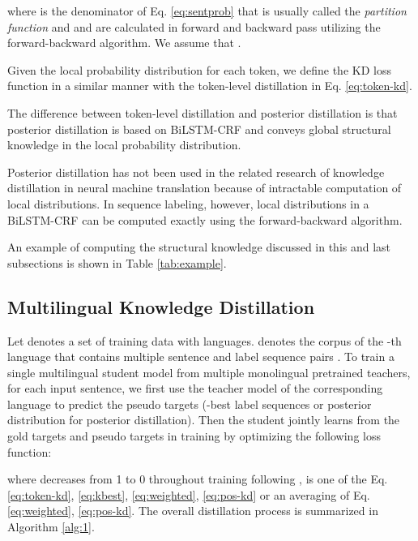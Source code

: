 \documentclass[11pt,a4paper]{article}
\begin{document}
where  is the denominator of Eq. \ref{eq:sentprob} that is usually called the \textit{partition function} and  and  are calculated in forward and backward pass utilizing the forward-backward algorithm. We assume that .

Given the local probability distribution for each token, we define the KD loss function in a similar manner with the token-level distillation in Eq. \ref{eq:token-kd}. 




The difference between token-level distillation and posterior distillation is that posterior distillation is based on BiLSTM-CRF and conveys global structural knowledge in the local probability distribution. 

Posterior distillation has not been used in the related research of knowledge distillation in neural machine translation because of intractable computation of local distributions. In sequence labeling, however, local distributions in a BiLSTM-CRF can be computed exactly using the forward-backward algorithm. 

An example of computing the structural knowledge discussed in this and last subsections is shown in Table \ref{tab:example}.



\subsection{Multilingual Knowledge Distillation}
Let  denotes a set of training data with  languages.  denotes the corpus of the -th language that contains multiple sentence and label sequence pairs . To train a single multilingual student model from multiple monolingual pretrained teachers, for each input sentence, we first use the teacher model of the corresponding language to predict the pseudo targets (-best label sequences or posterior distribution for posterior distillation). Then the student jointly learns from the gold targets and pseudo targets in training by optimizing the following loss function:

where  decreases from 1 to 0 throughout training following \citet{clark-etal-2019-bam},  is one of the Eq. \ref{eq:token-kd}, \ref{eq:kbest}, \ref{eq:weighted}, \ref{eq:pos-kd} or an averaging of Eq. \ref{eq:weighted}, \ref{eq:pos-kd}. The overall distillation process is summarized in Algorithm \ref{alg:1}.  
\end{document}

